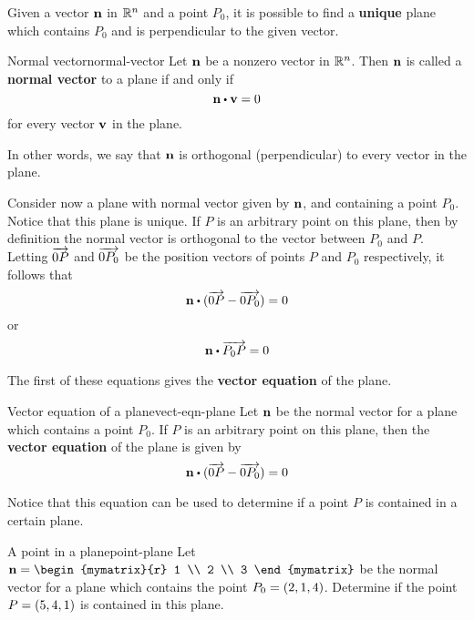 

Given a vector $\mbox{\bf n}$ in $\mathbb{R}^n$ and a point $P_0$, it is possible
to find a \textbf{unique} plane which contains $P_0$ and is
perpendicular to the given vector.

\begin{definition}{Normal vector}{normal-vector}
Let $\mbox{\bf n}$ be a nonzero vector in $\mathbb{R}^n$. Then $\mbox{\bf n}$ is called a \textbf{normal vector} to a plane if and only if 
\[
\vect{n} \dotprod \vect{v} = 0
\]
for every vector $\mbox{\bf v}$ in the plane. 
\end{definition}

In other words, we say that $\mbox{\bf n}$ is orthogonal (perpendicular) to every vector in the plane. 

Consider now a plane with normal vector given by $\mbox{\bf n}$, and containing a point $P_0$. Notice that this plane is unique. If $P$ is an arbitrary point on this plane, then by definition the normal vector is orthogonal to the vector between $P_0$ and $P$. Letting $\overrightarrow{0P}$ and $\overrightarrow{0P_0}$ be the position vectors of points $P$ and $P_0$ respectively, it follows that 
\[
\vect{n} \dotprod (\longvect{0P} - \longvect{0P_0}) = 0 
\]
or
\[
\vect{n} \dotprod \longvect{P_0P} = 0 
\]

The first of these equations gives the \textbf{vector equation} of the plane. 

\begin{definition}{Vector equation of a plane}{vect-eqn-plane}
Let $\mbox{\bf n}$ be the normal vector for a plane which contains a point $P_0$. If $P$ is an arbitrary point on this plane, then the \textbf{vector equation} of the plane is given by 
\[
\vect{n} \dotprod (\longvect{0P} - \longvect{0P_0}) = 0
\]
\end{definition}

Notice that this equation can be used to determine if a point $P$ is contained in a certain plane. 

\begin{example}{A point in a plane}{point-plane}
Let $\vect{n} = 
\begin{mymatrix}{r}
1 \\
2 \\
3 
\end{mymatrix}$ be the normal vector for a plane which contains the point $P_0 = \left(2, 1, 4 \right)$. Determine if the point $P = \left(5, 4, 1 \right)$ is contained in this plane. 
\end{example}

